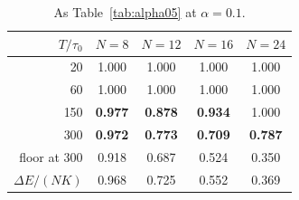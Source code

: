 \begin{table}[t]
\centering
\caption{As Table~\ref{tab:alpha05} at $\alpha = 0.1$.}
\label{tab:alpha01}
\small
\begin{tabular}{rcccc}
\toprule
$T/\tau_0$ & $N=8$ & $N=12$ & $N=16$ & $N=24$ \\
\midrule
20 & 1.000 & 1.000 & 1.000 & 1.000 \\
60 & 1.000 & 1.000 & 1.000 & 1.000 \\
150 & \textbf{0.977} & \textbf{0.878} & \textbf{0.934} & 1.000 \\
300 & \textbf{0.972} & \textbf{0.773} & \textbf{0.709} & \textbf{0.787} \\
\midrule
floor at 300 & 0.918 & 0.687 & 0.524 & 0.350 \\
$\Delta E/(NK)$ & 0.968 & 0.725 & 0.552 & 0.369 \\
\bottomrule
\end{tabular}
\end{table}
